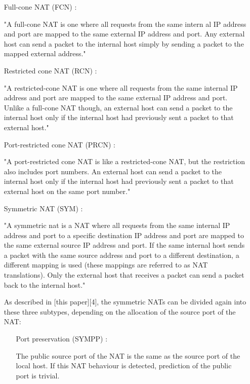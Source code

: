 \documentclass{article}
\begin{document}
\begin{itemize}

\item [Full-cone NAT (FCN)]:

"A full-cone NAT is one where all requests from the same intern al IP
address and port are mapped to the same external IP address and
port. Any external host can send a packet to the internal host simply
by sending a packet to the mapped external address."

\item [Restricted cone NAT (RCN)]:

"A restricted-cone NAT is one where all requests from the same
internal IP address and port are mapped to the same external IP
address and port. Unlike a full-cone NAT though, an external host can
send a packet to the internal host only if the internal host had
previously sent a packet to that external host."

\item [Port-restricted cone NAT (PRCN)]:

"A port-restricted cone NAT is like a restricted-cone NAT, but the
restriction also includes port numbers. An external host can send a
packet to the internal host only if the internal host had previously
sent a packet to that external host on the same port number."

\item [Symmetric NAT (SYM)]:

"A symmetric nat is a NAT where all requests from the same internal IP
address and port to a specific destination IP address and port are
mapped to the same external source IP address and port. If the same
internal host sends a packet with the same source address and port to
a different destination, a different mapping is used (these mappings
are referred to as NAT translations). Only the external host that
receives a packet can send a packet back to the internal host."

As described in [this paper][4], the symmetric NATs can be divided
again into these three subtypes, depending on the allocation of the
source port of the NAT:

\begin{itemize}

\item [Port preservation (SYMPP)]:

The public source port of the NAT is the same as the source port of
the local host. If this NAT behaviour is detected, prediction of the
public port is trivial.


\end{itemize}
\end{itemize}
\end{document}
